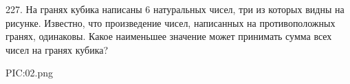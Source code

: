 227. На гранях кубика написаны 6 натуральных чисел, три из которых видны на рисунке. Известно, что произведение чисел, написанных на противоположных гранях, одинаковы. Какое наименьшее значение может принимать сумма всех чисел на гранях кубика?
\begin{center}
{{PIC:02.png}}
\end{center}
